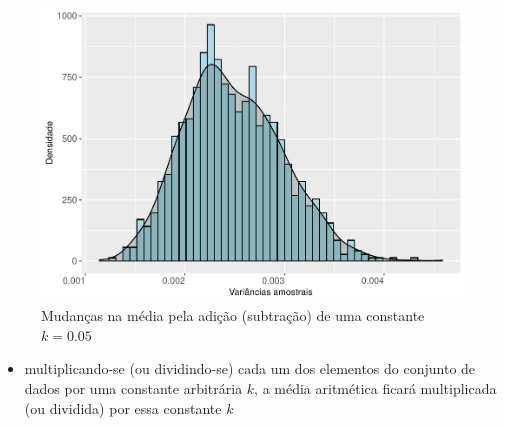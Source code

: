\documentclass[
]{book}
\providecommand{\tightlist}{%
  \setlength{\itemsep}{0pt}\setlength{\parskip}{0pt}}
\begin{document}
\begin{figure}

{\centering \includegraphics{apostila_files/figure-latex/unnamed-chunk-34-1} 

}

\caption{Mudanças na média pela adição (subtração) de uma constante $k=0.05$}\label{fig:unnamed-chunk-34}
\end{figure}

\begin{itemize}
\tightlist
\item
  multiplicando-se (ou dividindo-se) cada um dos elementos do conjunto de dados por uma constante arbitrária \(k\), a média aritmética ficará multiplicada (ou dividida) por essa constante \(k\)
\end{itemize}
\end{document}
